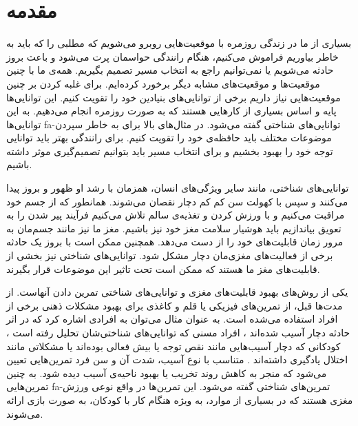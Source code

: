 \documentclass[twoside, a4paper,11pt]{book}
\numberwithin{equation}{chapter}
\numberwithin{table}{chapter}
\numberwithin{figure}{chapter}
\numberwithin{equation}{chapter}
\newcommand{\mls}[1]{\gls{fa-#1}\glsuseri{la-#1}}
\begin{document}


\newpage
\thispagestyle{empty}
\mbox{}

\renewcommand\listfigurename{فهرست شکل‌ها}
\renewcommand\listtablename{فهرست جدول‌ها}

\begin{doublespace}\small{
\tableofcontents
\listoftables
\listoffigures
}\end{doublespace}





\pagestyle{fancy}	
\fancyhead{} 
\fancyhead[RO]{\leftmark}
\fancyhead[LO]{\thepage}
\fancyhead[LE]{\rightmark}
\fancyhead[RE]{\thepage}
\fancyfoot{} 
\renewcommand{\headrulewidth}{0.6pt} 
\renewcommand{\footrulewidth}{0pt}

\chapter{مقدمه}
\label{chapter:introduction}
\setcounter{page}{1}
\thispagestyle{plain}

بسیاری از ما در زندگی روزمره با موقعیت‌هایی روبرو می‌شویم که مطلبی را که باید به خاطر بیاوریم فراموش می‌کنیم، هنگام رانندگی حواسمان پرت می‌شود و باعث بروز حادثه می‌شویم یا نمی‌توانیم راجع به انتخاب مسیر تصمیم بگیریم. همه‌ی ما با چنین موقعیت‌ها و موقعیت‌های مشابه دیگر برخورد کرده‌ایم. برای غلبه کردن بر چنین موقعیت‌هایی نیاز داریم برخی از توانایی‌های بنیادین خود را تقویت کنیم. این توانایی‌ها پایه و اساس بسیاری از کارهایی هستند که به صورت روزمره انجام می‌دهیم. به این توانایی‌ها \mls{توانایی‌های شناختی} گفته می‌شود. در مثال‌های بالا برای به خاطر سپردن موضوعات مختلف باید حافظه‌ی خود را تقویت کنیم. برای رانندگی بهتر باید توانایی توجه خود را بهبود بخشیم و برای انتخاب مسیر باید بتوانیم تصمیم‌گیری موثر داشته باشیم. 

توانایی‌های شناختی، مانند سایر ویژگی‌های انسان، همزمان با رشد او ظهور و بروز پیدا می‌کنند و سپس با کهولت سن کم کم دچار نقصان می‌شوند. همانطور که از جسم خود مراقبت می‌کنیم و با ورزش کردن و تغذیه‌ی سالم تلاش می‌کنیم فرآیند پیر شدن را به تعویق بیاندازیم باید هوشیار سلامت مغز خود نیز باشیم. مغز ما نیز مانند جسم‌مان به مرور زمان قابلیت‌های خود را از دست می‌دهد. همچنین ممکن است با بروز یک حادثه برخی از فعالیت‌های مغزی‌مان دچار مشکل شود. توانایی‌های شناختی نیز بخشی از قابلیت‌های مغز ما هستند که ممکن است تحت تاثیر این موضوعات قرار بگیرند.

یکی از روش‌های بهبود قابلیت‌های مغزی و توانایی‌های شناختی تمرین دادن آنهاست. از مدت‌ها قبل، از تمرین‌های فیزیکی یا قلم و کاغذی برای بهبود مشکلات ذهنی برخی از افراد استفاده می‌شده است. به عنوان مثال می‌توان به افرادی اشاره کرد که در اثر حادثه دچار آسیب شده‌اند \cite{carney1999TBI}، افراد مسنی که توانایی‌های شناختی‌شان تحلیل رفته است \cite{rapp2002olderAdults}، کودکانی که دچار آسیب‌هایی مانند نقص توجه یا بیش فعالی بوده‌اند یا مشکلاتی مانند اختلال یادگیری داشته‌اند \cite{kimberly1999ADHDKids}. متناسب با نوع آسیب، شدت آن و سن فرد تمرین‌هایی تعیین می‌شود که منجر به کاهش روند تخریب یا بهبود ناحیه‌ی آسیب دیده شود. به چنین تمرین‌هایی  \mls{تمرین‌های شناختی} گفته می‌شود. این تمرین‌ها در واقع نوعی ورزش مغزی هستند که در بسیاری از موارد، به ویژه هنگام کار با کودکان، به صورت بازی ارائه می‌شوند.
\end{document}
